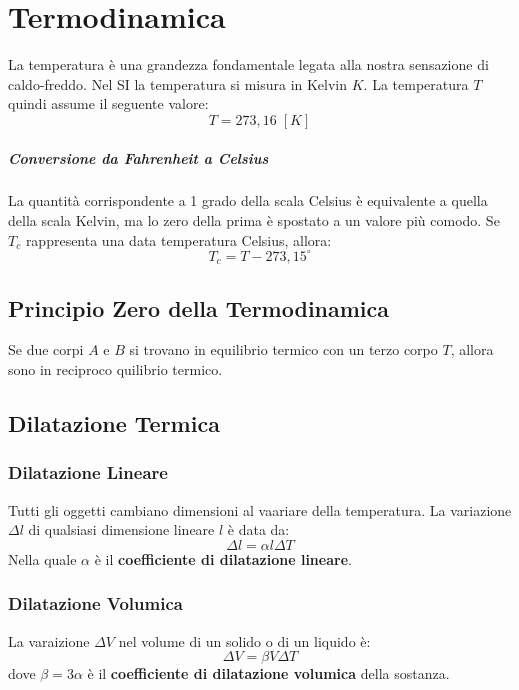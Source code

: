 \chapter{Termodinamica} La temperatura è una grandezza fondamentale legata alla
nostra sensazione di caldo-freddo. Nel SI la temperatura si misura in Kelvin 
$K$. La temperatura $T$ quindi assume il seguente valore:
    \begin{equation*}
        T = 273,16 \; [K]
    \end{equation*}

    \paragraph{Conversione da Fahrenheit a Celsius} La quantità corrispondente
    a 1 grado della scala Celsius è equivalente a quella della scala Kelvin, ma
    lo zero della prima è spostato a un valore più comodo. Se $T_c$ rappresenta
    una data temperatura Celsius, allora:
        \begin{equation}
            T_c = T - 273,15^\circ 
        \end{equation}

    \section{Principio Zero della Termodinamica} Se due corpi $A$ e $B$ si 
    trovano in equilibrio termico con un terzo corpo $T$, allora sono in 
    reciproco quilibrio termico.




    \section{Dilatazione Termica}
        \subsection{Dilatazione Lineare} Tutti gli oggetti cambiano dimensioni
        al vaariare della temperatura. La variazione $\Delta l$  di qualsiasi 
        dimensione lineare $l$ è data da:
            \begin{equation}
                \Delta l = \alpha l \Delta T
            \end{equation}
        Nella quale $\alpha$ è il \textbf{coefficiente di dilatazione lineare}.

        \subsection{Dilatazione Volumica} La varaizione $\Delta V$ nel volume 
        di un solido o di un liquido è:
            \begin{equation}
                \Delta V = \beta V \Delta T
            \end{equation}
        dove $\beta = 3\alpha$ è il \textbf{coefficiente di dilatazione 
        volumica} della sostanza.

